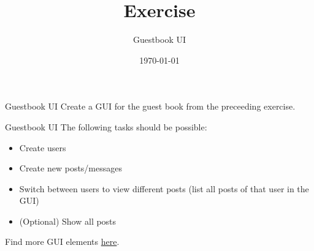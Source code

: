 


\title{Exercise}
\subtitle{Guestbook UI}
\date{\today}




\begin{frame}
    \titlepage
\end{frame}

\begin{frame}[fragile]{Guestbook UI}
    Create a GUI for the guest book from the preceeding exercise.
\end{frame}

\begin{frame}{Guestbook UI}
    The following tasks should be possible:
    \begin{itemize}
        \item Create users
        \item Create new posts/messages
        \item Switch between users to view different posts (list all posts of that user in the GUI)
        \item (Optional) Show all posts
    \end{itemize}
    Find more GUI elements \href{http://www.java-tutorial.org/swing.html}{here}.
\end{frame}


